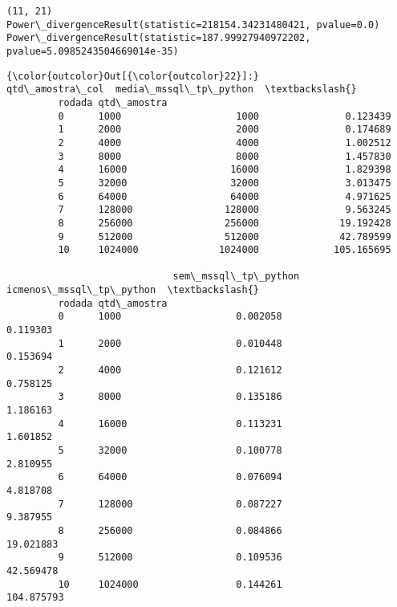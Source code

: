 \documentclass[11pt]{article}
\begin{document}
    \begin{Verbatim}[commandchars=\\\{\}]
(11, 21)
Power\_divergenceResult(statistic=218154.34231480421, pvalue=0.0)
Power\_divergenceResult(statistic=187.99927940972202, pvalue=5.0985243504669014e-35)

    \end{Verbatim}

\begin{Verbatim}[commandchars=\\\{\}]
{\color{outcolor}Out[{\color{outcolor}22}]:}                     qtd\_amostra\_col  media\_mssql\_tp\_python  \textbackslash{}
         rodada qtd\_amostra                                           
         0      1000                    1000               0.123439   
         1      2000                    2000               0.174689   
         2      4000                    4000               1.002512   
         3      8000                    8000               1.457830   
         4      16000                  16000               1.829398   
         5      32000                  32000               3.013475   
         6      64000                  64000               4.971625   
         7      128000                128000               9.563245   
         8      256000                256000              19.192428   
         9      512000                512000              42.789599   
         10     1024000              1024000             105.165695   
         
                             sem\_mssql\_tp\_python  icmenos\_mssql\_tp\_python  \textbackslash{}
         rodada qtd\_amostra                                                 
         0      1000                    0.002058                 0.119303   
         1      2000                    0.010448                 0.153694   
         2      4000                    0.121612                 0.758125   
         3      8000                    0.135186                 1.186163   
         4      16000                   0.113231                 1.601852   
         5      32000                   0.100778                 2.810955   
         6      64000                   0.076094                 4.818708   
         7      128000                  0.087227                 9.387955   
         8      256000                  0.084866                19.021883   
         9      512000                  0.109536                42.569478   
         10     1024000                 0.144261               104.875793   
         

\end{Verbatim}
\end{document}
